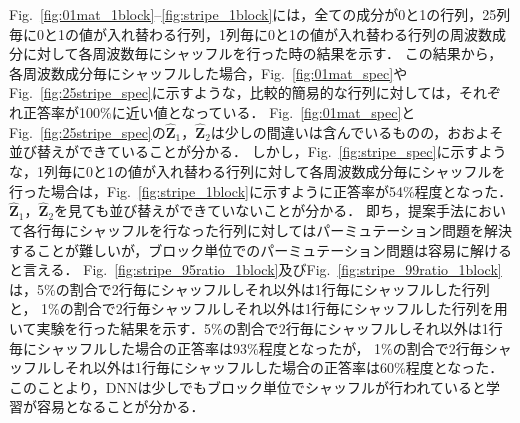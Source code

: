 Fig.~\ref{fig:01mat_1block}--\ref{fig:stripe_1block}には，全ての成分が0と1の行列，25列毎に0と1の値が入れ替わる行列，1列毎に0と1の値が入れ替わる行列の周波数成分に対して各周波数毎にシャッフルを行った時の結果を示す．
この結果から，各周波数成分毎にシャッフルした場合，Fig.~\ref{fig:01mat_spec}やFig.~\ref{fig:25stripe_spec}に示すような，比較的簡易的な行列に対しては，それぞれ正答率が100\%に近い値となっている．
Fig.~\ref{fig:01mat_spec}とFig.~\ref{fig:25stripe_spec}の$\hat{\bm{Z}}_1$，$\hat{\bm{Z}}_2$は少しの間違いは含んでいるものの，おおよそ並び替えができていることが分かる．
しかし，Fig.~\ref{fig:stripe_spec}に示すような，1列毎に0と1の値が入れ替わる行列に対して各周波数成分毎にシャッフルを行った場合は，Fig.~\ref{fig:stripe_1block}に示すように正答率が54\%程度となった．
$\hat{\bm{Z}}_1$，$\hat{\bm{Z}}_2$を見ても並び替えができていないことが分かる．
即ち，提案手法において各行毎にシャッフルを行なった行列に対してはパーミュテーション問題を解決することが難しいが，ブロック単位でのパーミュテーション問題は容易に解けると言える．
Fig.~\ref{fig:stripe_95ratio_1block}及びFig.~\ref{fig:stripe_99ratio_1block}は，5\%の割合で2行毎にシャッフルしそれ以外は1行毎にシャッフルした行列と，
1\%の割合で2行毎シャッフルしそれ以外は1行毎にシャッフルした行列を用いて実験を行った結果を示す．5\%の割合で2行毎にシャッフルしそれ以外は1行毎にシャッフルした場合の正答率は93\%程度となったが，
1\%の割合で2行毎シャッフルしそれ以外は1行毎にシャッフルした場合の正答率は60\%程度となった．
このことより，DNNは少しでもブロック単位でシャッフルが行われていると学習が容易となることが分かる．

